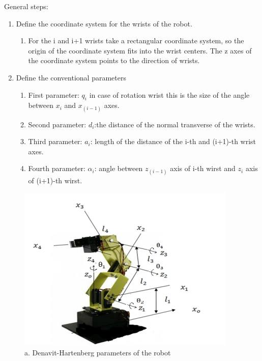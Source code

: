General steps:
	\begin{enumerate}
			\item Define the coordinate system for the wrists of the robot.\\
			\begin{enumerate}
				\item For the i and i+1 wrists take a rectangular coordinate system, so the origin of the coordinate system fits into the wrist centers. The z axes of the coordinate system points to the direction of wrists. \\
			\end{enumerate}
			\item Define the conventional parameters \\
			
			\begin{enumerate}
				\item First parameter: $q_i$ in case of rotation wrist this is the size of the angle between $x_i$ and $x_(i-1)$ axes. \\
				\item Second parameter: $d_i$:the distance of the normal transverse of the wrists. \\
				\item Third parameter: $a_i$: length of the distance of the i-th and (i+1)-th wrist axes. \\
				\item Fourth parameter:  $\alpha _i$: angle between $z_(i-1)$ axis of i-th wirst and $z_i$ axis of (i+1)-th  wirst. \\
			\end{enumerate}
		\end{enumerate}
		
		\begin{figure}[H]
			\centering
			\includegraphics[scale=1.2]{./images/denavit_parameters}
			\caption{a. Denavit-Hartenberg parameters of the robot}
		\end{figure}
		
